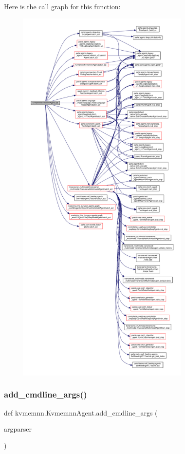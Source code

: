 Here is the call graph for this function\+:
\nopagebreak
\begin{figure}[H]
\begin{center}
\leavevmode
\includegraphics[height=550pt]{classkvmemnn_1_1KvmemnnAgent_a6f57723b871277392a3f3fd627c717d8_cgraph}
\end{center}
\end{figure}
\mbox{\label{classkvmemnn_1_1KvmemnnAgent_a560f704744b9e1040eed00cd23fba59c}} 
\subsubsection{\texorpdfstring{add\+\_\+cmdline\+\_\+args()}{add\_cmdline\_args()}}
{\footnotesize\ttfamily def kvmemnn.\+Kvmemnn\+Agent.\+add\+\_\+cmdline\+\_\+args (\begin{DoxyParamCaption}\item[{}]{argparser }\end{DoxyParamCaption})\hspace{0.3cm}{\ttfamily [static]}}

